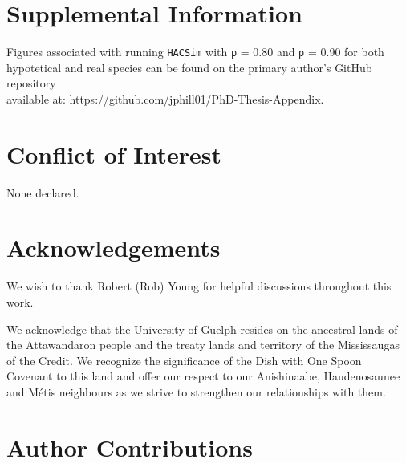 \section*{Supplemental Information}

Figures associated with running {\tt HACSim} with {\tt p} = 0.80 and {\tt p} = 0.90 for both \\ hypotetical and real species can be found on the primary author's GitHub repository \\ available at: https://github.com/jphill01/PhD-Thesis-Appendix.



\section*{Conflict of Interest}

None declared.



\section*{Acknowledgements}

We wish to thank Robert (Rob) Young for helpful discussions throughout this work.



We acknowledge that the University of Guelph resides on the ancestral lands of the Attawandaron people and the treaty lands and territory of the Mississaugas of the Credit. We recognize the significance of the Dish with One Spoon Covenant to this land and offer our respect to our Anishinaabe, Haudenosaunee and M{\'e}tis neighbours as we strive to strengthen our relationships with them.



\section*{Author Contributions}

